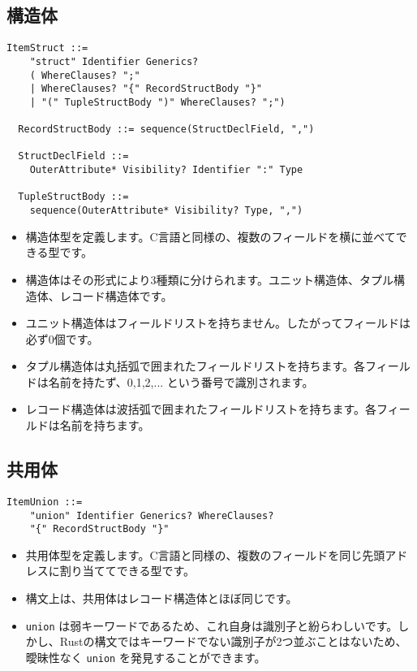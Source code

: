 \documentclass[dvipdfmx,uplatex,papersize,a4paper,10pt]{jsbook}
\theoremstyle{definition}
\begin{document}
\subsection{構造体}

\begin{lstlisting}[language=BNFLike, gobble=2]
  ItemStruct ::=
    "struct" Identifier Generics?
    ( WhereClauses? ";"
    | WhereClauses? "{" RecordStructBody "}"
    | "(" TupleStructBody ")" WhereClauses? ";")

  RecordStructBody ::= sequence(StructDeclField, ",")

  StructDeclField ::=
    OuterAttribute* Visibility? Identifier ":" Type

  TupleStructBody ::=
    sequence(OuterAttribute* Visibility? Type, ",")
\end{lstlisting}

\begin{itemize}
  \item 構造体型を定義します。C言語と同様の、複数のフィールドを横に並べてできる型です。
  \item 構造体はその形式により3種類に分けられます。ユニット構造体、タプル構造体、レコード構造体です。
  \item ユニット構造体はフィールドリストを持ちません。したがってフィールドは必ず0個です。
  \item タプル構造体は丸括弧で囲まれたフィールドリストを持ちます。各フィールドは名前を持たず、0,1,2,... という番号で識別されます。
  \item レコード構造体は波括弧で囲まれたフィールドリストを持ちます。各フィールドは名前を持ちます。
\end{itemize}

\subsection{共用体}

\begin{lstlisting}[language=BNFLike, gobble=2]
  ItemUnion ::=
    "union" Identifier Generics? WhereClauses?
    "{" RecordStructBody "}"
\end{lstlisting}

\begin{itemize}
  \item 共用体型を定義します。C言語と同様の、複数のフィールドを同じ先頭アドレスに割り当ててできる型です。
  \item 構文上は、共用体はレコード構造体とほぼ同じです。
  \item \verb|union| は弱キーワードであるため、これ自身は識別子と紛らわしいです。しかし、Rustの構文ではキーワードでない識別子が2つ並ぶことはないため、曖昧性なく \verb|union| を発見することができます。
\end{itemize}
\end{document}
